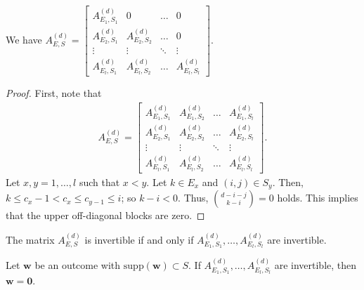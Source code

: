 \begin{proposition}
    We have \( A_{E,S}^{(d)} = 
    \begin{bmatrix}
        A_{E_1,S_1}^{(d)} & 0 & \dots & 0 \\
        A_{E_2,S_1}^{(d)} & A_{E_2,S_2}^{(d)} & \dots & 0 \\
        \vdots & \vdots & \ddots & \vdots \\
        A_{E_l,S_1}^{(d)} & A_{E_l,S_2}^{(d)} & \dots & A_{E_l,S_l}^{(d)}
    \end{bmatrix} \).
\end{proposition}

\begin{proof}
    First, note that 
    \begin{align*}
        A_{E,S}^{(d)} = 
        \begin{bmatrix}
            A_{E_1,S_1}^{(d)} & A_{E_1,S_2}^{(d)} & \dots & A_{E_1,S_l}^{(d)} \\
            A_{E_2,S_1}^{(d)} & A_{E_2,S_2}^{(d)} & \dots & A_{E_2,S_l}^{(d)} \\
            \vdots & \vdots & \ddots & \vdots \\
            A_{E_l,S_1}^{(d)} & A_{E_l,S_2}^{(d)} & \dots & A_{E_l,S_l}^{(d)}
        \end{bmatrix}.
    \end{align*}
    Let \( x,y = 1, \dots , l \) such that \( x < y \). Let \( k \in E_x \) and \( (i,j) \in S_y \).
    Then, \( k \leq c_x - 1 < c_x \leq c_{y - 1} \leq i \); so \( k - i < 0 \). Thus, \( \binom{d-i-j}{k-i} = 0 \) holds. This implies that the upper off-diagonal blocks are zero.
\end{proof}

\begin{corollary}
    The matrix \( A^{(d)}_{E,S} \) is invertible if and only if \( A^{(d)}_{E_1,S_1}, \dots,  A^{(d)}_{E_l,S_l} \) are invertible.
\end{corollary}

\begin{corollary}\label{cor:invertibility-criterion-nooos}
    Let \( \mathbf{w} \) be an outcome with \( \mathrm{supp}(\mathbf w) \subset S \).
    If \( A^{(d)}_{E_1,S_1}, \dots,  A^{(d)}_{E_l,S_l} \) are invertible, then \( \mathbf{w} = \mathbf 0 \).
\end{corollary}

